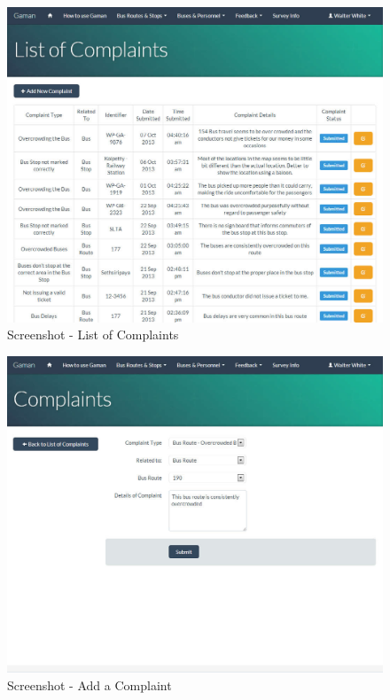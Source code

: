 \begin {figure} [h!]
\centering
\includegraphics[scale=0.2]{listComplaints}
\caption [Screenshot - List of Complaints] {Screenshot - List of Complaints}
\label {image-listComplaints}
\end {figure}

\begin {figure} [h!]
\centering
\includegraphics[scale=0.2]{addComplaint}
\caption [Screenshot - Add a Complaint] {Screenshot - Add a Complaint}
\label {image-addComplaint}
\end {figure}